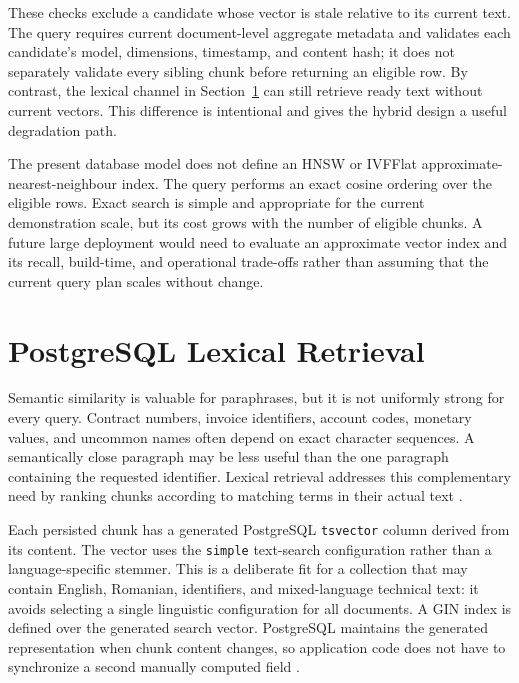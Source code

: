 These checks exclude a candidate whose vector is stale relative to its current text. The query requires current document-level aggregate metadata and validates each candidate's model, dimensions, timestamp, and content hash; it does not separately validate every sibling chunk before returning an eligible row. By contrast, the lexical channel in Section~\ref{sec:lexical-retrieval} can still retrieve ready text without current vectors. This difference is intentional and gives the hybrid design a useful degradation path.

The present database model does not define an HNSW or IVFFlat approximate-nearest-neighbour index. The query performs an exact cosine ordering over the eligible rows. Exact search is simple and appropriate for the current demonstration scale, but its cost grows with the number of eligible chunks. A future large deployment would need to evaluate an approximate vector index and its recall, build-time, and operational trade-offs rather than assuming that the current query plan scales without change.

\section{PostgreSQL Lexical Retrieval}
\label{sec:lexical-retrieval}

Semantic similarity is valuable for paraphrases, but it is not uniformly strong for every query. Contract numbers, invoice identifiers, account codes, monetary values, and uncommon names often depend on exact character sequences. A semantically close paragraph may be less useful than the one paragraph containing the requested identifier. Lexical retrieval addresses this complementary need by ranking chunks according to matching terms in their actual text \cite{Manning2008IR,Luan2021SparseDense}.

Each persisted chunk has a generated PostgreSQL \texttt{tsvector} column derived from its content. The vector uses the \texttt{simple} text-search configuration rather than a language-specific stemmer. This is a deliberate fit for a collection that may contain English, Romanian, identifiers, and mixed-language technical text: it avoids selecting a single linguistic configuration for all documents. A GIN index is defined over the generated search vector. PostgreSQL maintains the generated representation when chunk content changes, so application code does not have to synchronize a second manually computed field \cite{PostgreSQLFTS}.

